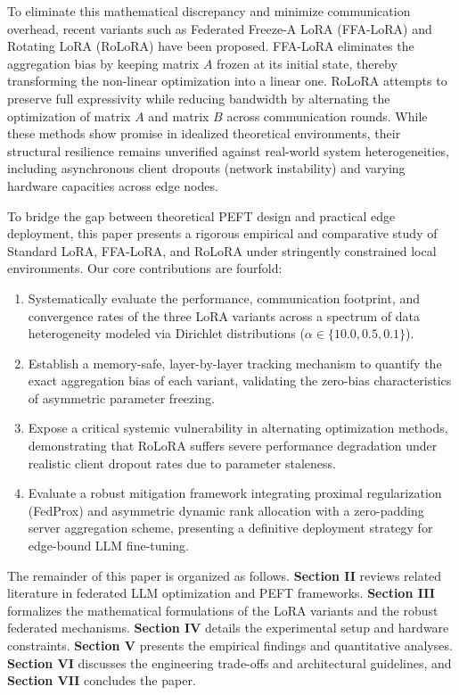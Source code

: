 To eliminate this mathematical discrepancy and minimize communication overhead, recent variants such as Federated Freeze-A LoRA (FFA-LoRA) \cite{ffa_lora_paper} and Rotating LoRA (RoLoRA) \cite{rolora_paper} have been proposed. FFA-LoRA eliminates the aggregation bias by keeping matrix $A$ frozen at its initial state, thereby transforming the non-linear optimization into a linear one. RoLoRA attempts to preserve full expressivity while reducing bandwidth by alternating the optimization of matrix $A$ and matrix $B$ across communication rounds. While these methods show promise in idealized theoretical environments, their structural resilience remains unverified against real-world system heterogeneities, including asynchronous client dropouts (network instability) and varying hardware capacities across edge nodes.



To bridge the gap between theoretical PEFT design and practical edge deployment, this paper presents a rigorous empirical and comparative study of Standard LoRA, FFA-LoRA, and RoLoRA under stringently constrained local environments. Our core contributions are fourfold:
\begin{enumerate}
    \item Systematically evaluate the performance, communication footprint, and convergence rates of the three LoRA variants across a spectrum of data heterogeneity modeled via Dirichlet distributions ($\alpha \in \{10.0, 0.5, 0.1\}$).
    \item Establish a memory-safe, layer-by-layer tracking mechanism to quantify the exact aggregation bias of each variant, validating the zero-bias characteristics of asymmetric parameter freezing.
    \item Expose a critical systemic vulnerability in alternating optimization methods, demonstrating that RoLoRA suffers severe performance degradation under realistic client dropout rates due to parameter staleness.
    \item Evaluate a robust mitigation framework integrating proximal regularization (FedProx) \cite{li2020federated} and asymmetric dynamic rank allocation with a zero-padding server aggregation scheme, presenting a definitive deployment strategy for edge-bound LLM fine-tuning.
\end{enumerate}


The remainder of this paper is organized as follows. \textbf{Section II} reviews related literature in federated LLM optimization and PEFT frameworks. \textbf{Section III} formalizes the mathematical formulations of the LoRA variants and the robust federated mechanisms. \textbf{Section IV} details the experimental setup and hardware constraints. \textbf{Section V} presents the empirical findings and quantitative analyses. \textbf{Section VI} discusses the engineering trade-offs and architectural guidelines, and \textbf{Section VII} concludes the paper.



